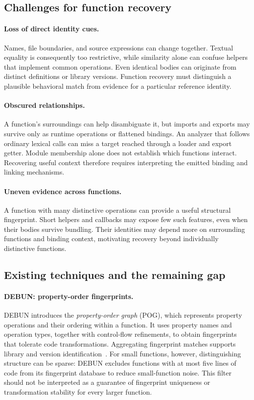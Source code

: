 \subsection{Challenges for function recovery}
\label{sec:recovery-challenges}
\paragraph{Loss of direct identity cues.}
Names, file boundaries, and source expressions can change together. Textual equality is consequently too restrictive, while similarity alone can confuse helpers that implement common operations. Even identical bodies can originate from distinct definitions or library versions. Function recovery must distinguish a plausible behavioral match from evidence for a particular reference identity.

\paragraph{Obscured relationships.}
A function's surroundings can help disambiguate it, but imports and exports may survive only as runtime operations or flattened bindings. An analyzer that follows ordinary lexical calls can miss a target reached through a loader and export getter. Module membership alone does not establish which functions interact. Recovering useful context therefore requires interpreting the emitted binding and linking mechanisms.

\paragraph{Uneven evidence across functions.}
A function with many distinctive operations can provide a useful structural fingerprint. Short helpers and callbacks may expose few such features, even when their bodies survive bundling. Their identities may depend more on surrounding functions and binding context, motivating recovery beyond individually distinctive functions.

\subsection{Existing techniques and the remaining gap}
\label{sec:background-prior-work}
\paragraph{DEBUN: property-order fingerprints.}
DEBUN introduces the \emph{property-order graph} (POG), which represents property operations and their ordering within a function. It uses property names and operation types, together with control-flow refinements, to obtain fingerprints that tolerate code transformations. Aggregating fingerprint matches supports library and version identification~\cite{kim2025debun}. For small functions, however, distinguishing structure can be sparse: DEBUN excludes functions with at most five lines of code from its fingerprint database to reduce small-function noise. This filter should not be interpreted as a guarantee of fingerprint uniqueness or transformation stability for every larger function.

